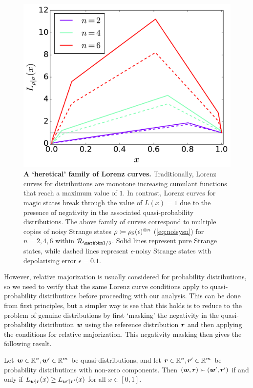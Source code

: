 \documentclass[pra,
aps,
twocolumn,
superscriptaddress,
groupedaddress,
nofootinbib,
reprint
]{revtex4-1}
\begin{document}
\begin{figure}
    \centering
    \includegraphics[scale=0.35]{figs/lc_strange.pdf}
    \caption{\textbf{A `heretical' family of Lorenz curves.} Traditionally, Lorenz curves for distributions are monotone increasing cumulant functions that reach a maximum value of $1$. In contrast, Lorenz curves for magic states break through the value of $L(x)=1$ due to the presence of negativity in the associated quasi-probability distributions. The above family of curves correspond to multiple copies of noisy Strange states $\rho\coloneqq\rho_{\rm{S}}(\epsilon)^{\otimes n}$ (\cref{eq:noisysn}) for $n=2,4,6$ within $\R_{\id/3}$. Solid lines represent pure Strange states, while dashed lines represent $\epsilon$-noisy Strange states with depolarising error $\epsilon = 0.1$.
    }
    \label{fig:lcs}
\end{figure}

However, relative majorization is usually considered for probability distributions, so we need to verify that the same Lorenz curve conditions apply to quasi-probability distributions before proceeding with our analysis. This can be done from first principles, but a simpler way is see that this holds is to reduce to the problem of genuine distributions by first `masking' the negativity in the quasi-probability distribution $\boldsymbol{w}$ using the reference distribution $\boldsymbol{r}$ and then applying the conditions for relative majorization. This negativity masking then gives the following result.

\begin{lemma} Let $\boldsymbol{w} \in \mathbb{R}^n,\boldsymbol{w}'\in \mathbb{R}^m$ be quasi-distributions, and let $\boldsymbol{r} \in \mathbb{R}^n, \boldsymbol{r}' \in \mathbb{R}^m$ be probability distributions with non-zero components. Then $(\boldsymbol{w}, \boldsymbol{r}) \succ (\boldsymbol{w}', \boldsymbol{r}')$ if and only if $L_{\boldsymbol{w}|\boldsymbol{r}}(x) \ge L_{\boldsymbol{w}' |\boldsymbol{r}'}(x)$ for all $x \in [0,1]$.
\end{lemma}
 
\end{document}
